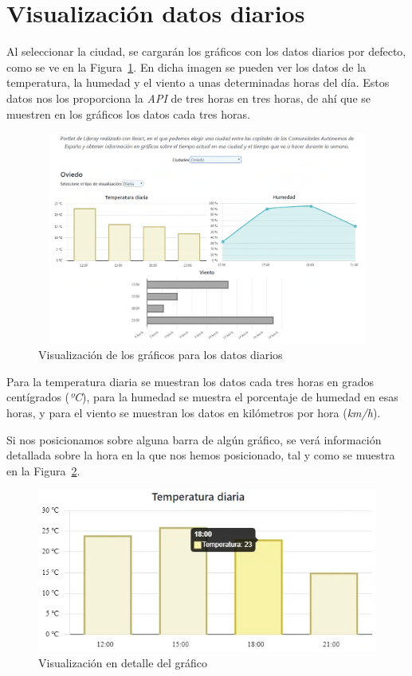 \documentclass[a4paper, 12pt]{book}
\begin{document}
\section{Visualización datos diarios}
\label{sec:visualizacion-diaria}
Al seleccionar la ciudad, se cargarán los gráficos con los datos diarios por defecto, como se ve en la Figura~\ref{fig:pantalla_diaria}. En dicha imagen se pueden ver los datos de la temperatura, la humedad y el viento a unas determinadas horas del día. Estos datos nos los proporciona la \textit{API} de tres horas en tres horas, de ahí que se muestren en los gráficos los datos cada tres horas.
\begin{figure}[h]
  \centering
  \includegraphics[width=13cm, height=7cm]{img_usadas/pantalla_diaria.png}
  \caption{Visualización de los gráficos para los datos diarios}
  \label{fig:pantalla_diaria}
\end{figure}

\vspace{5mm}
Para la temperatura diaria se muestran los datos cada tres horas en grados centígrados (\textit{ºC}), para la humedad se muestra el porcentaje de humedad en esas horas, y para el viento se muestran los datos en kilómetros por hora (\textit{km/h}).

\vspace{5mm}
Si nos posicionamos sobre alguna barra de algún gráfico, se verá información detallada sobre la hora en la que nos hemos posicionado, tal y como se muestra en la Figura~\ref{fig:detalle_chart}.
\begin{figure}[h]
  \centering
  \includegraphics{img_usadas/detalle_chart.png}
  \caption{Visualización en detalle del gráfico}
  \label{fig:detalle_chart}
\end{figure}
\end{document}
